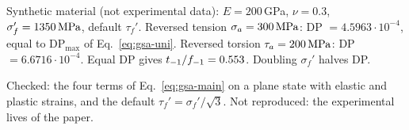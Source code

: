  Synthetic material (not experimental data): $E=200$\,GPa, $\nu=0.3$,
$\sigma_f'=1350\,\mathrm{MPa}$, default $\tau_f'$. Reversed tension $\sigma_a=300\,\mathrm{MPa}$:
DP $=4.5963\cdot10^{-4}$, equal to $\mathrm{DP}_{\max}$ of Eq.~\eqref{eq:gsa-uni}. Reversed torsion
$\tau_a=200\,\mathrm{MPa}$: DP $=6.6716\cdot10^{-4}$. Equal DP gives $t_{-1}/f_{-1}=0.553$. Doubling $\sigma_f'$
halves DP.

 Checked: the four terms of Eq.~\eqref{eq:gsa-main} on a plane state with
elastic and plastic strains, and the default $\tau_f'=\sigma_f'/\sqrt3$. Not reproduced: the
experimental lives of the paper.
